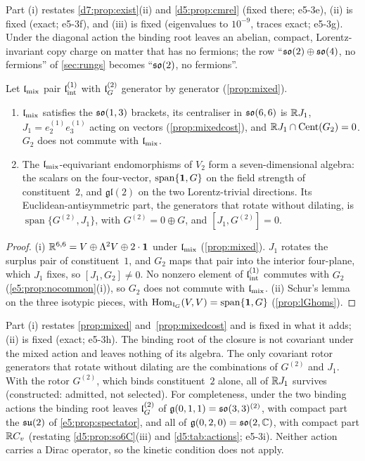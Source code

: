 Part (i) restates \cref{d7:prop:exist}(ii) and \cref{d5:prop:cmrel} (fixed there; e5-3e), (ii) is fixed (exact; e5-3f), and (iii) is fixed
(eigenvalues to $10^{-9}$, traces exact; e5-3g). Under the diagonal action the binding root leaves an abelian, compact, Lorentz-invariant copy charge
on matter that has no fermions; the row ``$\mathfrak{so}(2)\oplus\mathfrak{so}(4)$, no fermions'' of \cref{sec:rungs} becomes ``$\mathfrak{so}(2)$, no fermions''.

\begin{proposition}
\label{e5:prop:mixed}
Let $\mathfrak l_{\rm mix}$ pair $\mathfrak l_{\rm int}^{(1)}$ with $\mathfrak l_G^{(2)}$ generator by generator (\cref{prop:mixed}).
\begin{enumerate}[label=(\roman*),leftmargin=2.2em]
\item $\mathfrak l_{\rm mix}$ satisfies the $\mathfrak{so}(1,3)$ brackets, its centraliser in $\mathfrak{so}(6,6)$ is $\mathbb{R} J_1$, $J_1=e^{(1)}_2e^{(1)}_3$ acting on vectors
(\cref{prop:mixedcost}), and $\mathbb{R} J_1\cap\operatorname{Cent}(G_2)=0$. $G_2$ does not commute with $\mathfrak l_{\rm mix}$.
\item The $\mathfrak l_{\rm mix}$-equivariant endomorphisms of $V_2$ form a seven-dimensional algebra: the scalars on the four-vector, $\operatorname{span}\{\mathbf 1,G\}$ on
the field strength of constituent~$2$, and $\mathfrak{gl}(2)$ on the two Lorentz-trivial directions. Its Euclidean-antisymmetric part, the generators
that rotate without dilating, is $\operatorname{span}\{G^{(2)},J_1\}$, with $G^{(2)}=0\oplus G$, and $[J_1,G^{(2)}]=0$.
\end{enumerate}
\end{proposition}

\begin{proof}
(i) $\mathbb{R}^{6,6}=V\oplus\Lambda^2V\oplus2\cdot\mathbf1$ under $\mathfrak l_{\rm mix}$ (\cref{prop:mixed}). $J_1$ rotates the surplus pair of
constituent~$1$, and $G_2$ maps that pair into the interior four-plane, which $J_1$ fixes, so $[J_1,G_2]\neq0$. No nonzero element of
$\mathfrak l_{\rm int}^{(1)}$ commutes with $G_2$ (\cref{e5:prop:nocommon}(i)), so $G_2$ does not commute with $\mathfrak l_{\rm mix}$. (ii) Schur's lemma on the three isotypic pieces, with $\operatorname{Hom}_{\mathfrak l_G}(V,V)=\operatorname{span}\{\mathbf 1,G\}$
(\cref{prop:lGhoms}).
\end{proof}

Part (i) restates \cref{prop:mixed} and~\cref{prop:mixedcost} and is fixed in what it adds; (ii) is fixed (exact; e5-3h). The binding root of the
closure is not covariant under the mixed action and leaves nothing of its algebra. The only covariant rotor generators that rotate without
dilating are the combinations of $G^{(2)}$ and $J_1$. With the rotor $G^{(2)}$, which binds constituent~$2$ alone, all of $\mathbb{R} J_1$ survives
(constructed: admitted, not selected). For completeness, under the two binding actions the binding root leaves $\mathfrak l_G^{(2)}$ of
$\mathfrak g(0,1,1)=\mathfrak{so}(3,3)^{(2)}$, with compact part the $\mathfrak{su}(2)$ of \cref{e5:prop:spectator}, and all of $\mathfrak g(0,2,0)=\mathfrak{so}(2,\mathbb{C})$, with compact part
$\mathbb{R} C_v$ (restating \cref{d5:prop:so6C}(iii) and \cref{d5:tab:actions}; e5-3i). Neither action carries a Dirac operator, so the kinetic condition does
not apply.

